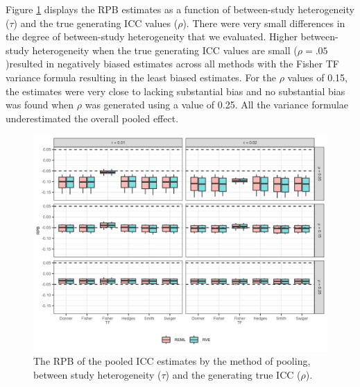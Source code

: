 Figure \ref{fig:RPBtau} displays the RPB estimates as a function of between-study heterogeneity ($\tau$) and the true generating ICC values ($\rho$). There were very small differences in the degree of between-study heterogeneity that we evaluated. Higher between-study heterogeneity when the true generating ICC values are small ($\rho = .05$)resulted in negatively biased estimates across all methods with the Fisher TF variance formula resulting in the least biased estimates. For the $\rho$ values of 0.15, the estimates were very close to lacking substantial bias and no substantial bias was found when $\rho$ was generated using a value of 0.25. All the variance formulae underestimated the overall pooled effect. 
\begin{figure}[h!]
\centerline{\includegraphics{Main/RPB_tau.png}}
\caption{The RPB of the pooled ICC estimates by the method of pooling, between study heterogeneity ($\tau$) and the generating true ICC ($\rho$). \label{fig:RPBtau}}
\end{figure}

